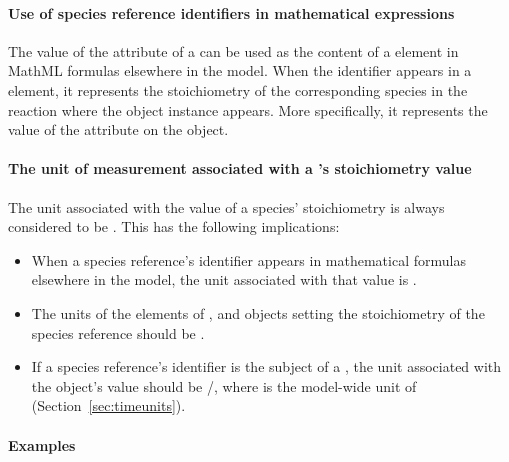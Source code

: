 \paragraph{Use of species reference identifiers in mathematical expressions}
\label{sec:reaction:speciesReferences-in-mathematical-expressions}

The value of the  attribute of a \SpeciesReference can
be used as the content of a  element in MathML formulas
elsewhere in the model.  When the identifier appears in a 
element, it represents the stoichiometry of the corresponding
species in the reaction where the \SpeciesReference object
instance appears.  More specifically, it represents the value of
the  attribute on the \SpeciesReference
object.


\paragraph{The unit of measurement associated with a
  's stoichiometry value}
\label{sec:speciesreferences-units}

The unit associated with the value of a species' stoichiometry is
always considered to be .  This has the
following implications:
\begin{itemize}

\item When a species reference's identifier appears in
  mathematical formulas elsewhere in the model, the unit
  associated with that value is .

\item The units of the  elements of \AssignmentRule,
  \InitialAssignment and \EventAssignment objects setting the
  stoichiometry of the species reference should be
  .

\item If a species reference's identifier is the subject of a
  \RateRule, the unit associated with the \RateRule object's value
  should be /, where
   is the model-wide unit of 
  (Section~\ref{sec:timeunits}).

\end{itemize}


\paragraph{Examples}


